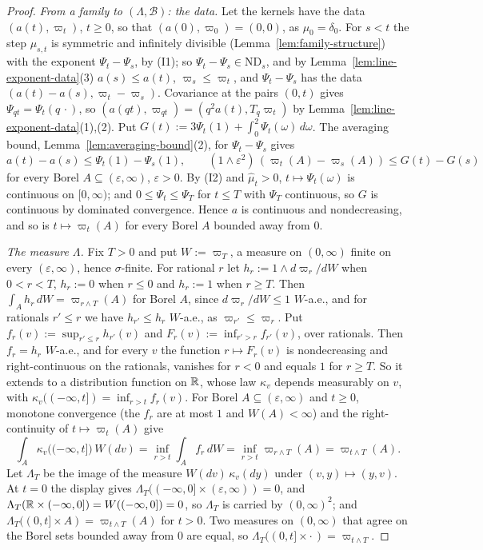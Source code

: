 \begin{proof}
\emph{From a family to $(\Lambda, \mathcal{B})$: the data.} Let the kernels have the data
$(a(t), \varpi_t)$, $t \ge 0$, so that $(a(0), \varpi_0) = (0, 0)$, as $\mu_0 = \delta_0$. For
$s < t$ the step $\mu_{s,t}$ is symmetric and infinitely divisible
(Lemma~\ref{lem:family-structure}) with the exponent $\Psi_t - \Psi_s$, by (I1); so
$\Psi_t - \Psi_s \in \mathrm{ND}_s$, and by Lemma~\ref{lem:line-exponent-data}(3)
$a(s) \le a(t)$, $\varpi_s \le \varpi_t$, and $\Psi_t - \Psi_s$ has the data
$(a(t) - a(s), \varpi_t - \varpi_s)$. Covariance at the pairs $(0, t)$ gives
$\Psi_{qt} = \Psi_t(q\,\cdot)$, so $(a(qt), \varpi_{qt}) = (q^2a(t), T_q\varpi_t)$ by
Lemma~\ref{lem:line-exponent-data}(1),(2). Put
$G(t) := 3\Psi_t(1) + \int_0^2\Psi_t(\omega)\,d\omega$. The averaging bound,
Lemma~\ref{lem:averaging-bound}(2), for $\Psi_t - \Psi_s$ gives
\[
  a(t) - a(s) \le \Psi_t(1) - \Psi_s(1), \qquad
  (1 \wedge \varepsilon^2)\,(\varpi_t(A) - \varpi_s(A)) \le G(t) - G(s)
\]
for every Borel $A \subseteq (\varepsilon, \infty)$, $\varepsilon > 0$. By (I2) and
$\widehat\mu_t > 0$, $t \mapsto \Psi_t(\omega)$ is continuous on $[0,\infty)$; and
$0 \le \Psi_t \le \Psi_T$ for $t \le T$ with $\Psi_T$ continuous, so $G$ is continuous by
dominated convergence. Hence $a$ is continuous and nondecreasing, and so is $t \mapsto \varpi_t(A)$
for every Borel $A$ bounded away from $0$.

\emph{The measure $\Lambda$.} Fix $T > 0$ and put $W := \varpi_T$, a measure on $(0,\infty)$
finite on every $(\varepsilon,\infty)$, hence $\sigma$-finite. For rational $r$ let
$h_r := 1 \wedge d\varpi_r/dW$ when $0 < r < T$, $h_r := 0$ when $r \le 0$ and $h_r := 1$ when
$r \ge T$. Then $\int_A h_r\,dW = \varpi_{r \wedge T}(A)$ for Borel $A$, since
$d\varpi_r/dW \le 1$ $W$-a.e., and for rationals $r' \le r$ we have $h_{r'} \le h_r$ $W$-a.e., as
$\varpi_{r'} \le \varpi_r$. Put $f_r(v) := \sup_{r' \le r}h_{r'}(v)$ and
$F_r(v) := \inf_{r' > r}f_{r'}(v)$, over rationals. Then $f_r = h_r$ $W$-a.e., and for every $v$
the function $r \mapsto F_r(v)$ is nondecreasing and right-continuous on the rationals, vanishes for
$r < 0$ and equals $1$ for $r \ge T$. So it extends to a distribution function on $\mathbb{R}$, whose
law $\kappa_v$ depends measurably on $v$, with $\kappa_v((-\infty, t]) = \inf_{r > t}f_r(v)$. For
Borel $A \subseteq (\varepsilon,\infty)$ and $t \ge 0$, monotone convergence (the $f_r$ are at most
$1$ and $W(A) < \infty$) and the right-continuity of $t \mapsto \varpi_t(A)$ give
\[
  \int_A\kappa_v\bigl((-\infty, t]\bigr)\,W(dv) = \inf_{r > t}\int_A f_r\,dW
  = \inf_{r > t}\varpi_{r \wedge T}(A) = \varpi_{t \wedge T}(A).
\]
Let $\Lambda_T$ be the image of the measure $W(dv)\,\kappa_v(dy)$ under $(v, y) \mapsto (y, v)$. At
$t = 0$ the display gives $\Lambda_T((-\infty,0] \times (\varepsilon,\infty)) = 0$, and
$\Lambda_T(\mathbb{R} \times (-\infty, 0]) = W((-\infty,0]) = 0$, so $\Lambda_T$ is carried by
$(0,\infty)^2$; and $\Lambda_T((0,t] \times A) = \varpi_{t \wedge T}(A)$ for $t > 0$. Two measures
on $(0,\infty)$ that agree on the Borel sets bounded away from $0$ are equal, so
$\Lambda_T((0,t] \times \cdot\,) = \varpi_{t \wedge T}$.


\end{proof}
